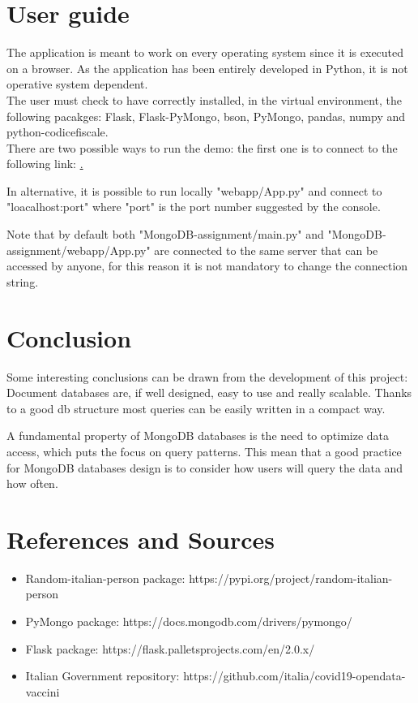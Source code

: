 \documentclass{article}
\begin{document}
\newpage

\section{User guide}
The application is meant to work on every operating system since it is executed on a browser. As the application has been entirely developed in Python, it is not operative system dependent.
\\The user must check to have correctly installed, in the virtual environment, the following pacakges: {\selectfont Flask, Flask-PyMongo, bson, PyMongo, pandas, numpy and python-codicefiscale}.
\hfill\break
\\There are two possible ways to run the demo: the first one is to connect to the following link: \href{https://c19-cert-viewer.herokuapp.com/}.

In alternative, it is possible to run locally {\selectfont"webapp/App.py"} and connect to {\selectfont"loacalhost:port"} where {\selectfont"port"} is the port number suggested by the console.

Note that by default both {\selectfont"MongoDB-assignment/main.py"} and {\selectfont"MongoDB-assignment/webapp/App.py"} are connected to the same server that can be accessed by anyone, for this reason it is not mandatory to change the connection string.
\section{Conclusion}

Some interesting conclusions can be drawn from the development of this project: Document databases are, if well designed, easy to use and really scalable. Thanks to a good db structure most queries can be easily written in a compact way.

A fundamental property of MongoDB databases is the need to optimize data access, which puts the focus on query patterns. This mean that a good practice for MongoDB databases design is to consider how users will query the data and how often.

\section{References and Sources}
\begin{itemize}
    \item Random-italian-person package: https://pypi.org/project/random-italian-person
    \item PyMongo package: https://docs.mongodb.com/drivers/pymongo/
    \item Flask package: https://flask.palletsprojects.com/en/2.0.x/
    \item Italian Government repository: https://github.com/italia/covid19-opendata-vaccini
\end{itemize}
\end{document}
